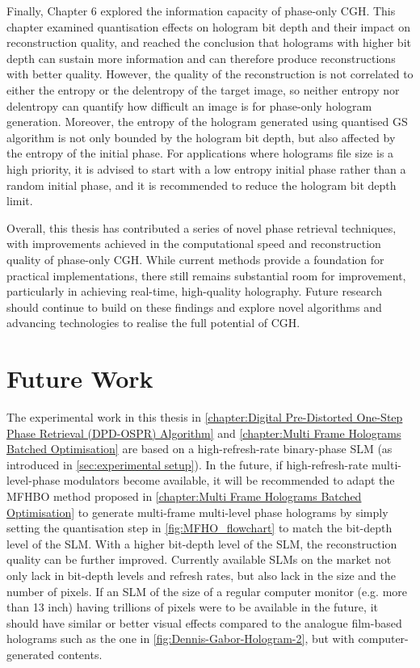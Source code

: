 Finally, Chapter 6 explored the information capacity of phase-only CGH. This chapter examined quantisation effects on hologram bit depth and their impact on reconstruction quality, and reached the conclusion that holograms with higher bit depth can sustain more information and can therefore produce reconstructions with better quality. However, the quality of the reconstruction is not correlated to either the entropy or the delentropy of the target image, so neither entropy nor delentropy can quantify how difficult an image is for phase-only hologram generation. Moreover, the entropy of the hologram generated using quantised GS algorithm is not only bounded by the hologram bit depth, but also affected by the entropy of the initial phase. For applications where holograms file size is a high priority, it is advised to start with a low entropy initial phase rather than a random initial phase, and it is recommended to reduce the hologram bit depth limit.

Overall, this thesis has contributed a series of novel phase retrieval techniques, with improvements achieved in the computational speed and reconstruction quality of phase-only CGH. While current methods provide a foundation for practical implementations, there still remains substantial room for improvement, particularly in achieving real-time, high-quality holography. Future research should continue to build on these findings and explore novel algorithms and advancing technologies to realise the full potential of CGH.

\section{Future Work}
The experimental work in this thesis in \cref{chapter:Digital Pre-Distorted One-Step Phase Retrieval (DPD-OSPR) Algorithm} and \cref{chapter:Multi Frame Holograms Batched Optimisation} are based on a high-refresh-rate binary-phase SLM (as introduced in \cref{sec:experimental setup}). In the future, if high-refresh-rate multi-level-phase modulators become available, it will be recommended to adapt the MFHBO method proposed in \cref{chapter:Multi Frame Holograms Batched Optimisation} to generate multi-frame multi-level phase holograms by simply setting the quantisation step in \cref{fig:MFHO_flowchart} to match the bit-depth level of the SLM. With a higher bit-depth level of the SLM, the reconstruction quality can be further improved. Currently available SLMs on the market not only lack in bit-depth levels and refresh rates, but also lack in the size and the number of pixels. If an SLM of the size of a regular computer monitor (e.g. more than 13 inch) having trillions of pixels were to be available in the future, it should have similar or better visual effects compared to the analogue film-based holograms such as the one in \cref{fig:Dennis-Gabor-Hologram-2}, but with computer-generated contents.


